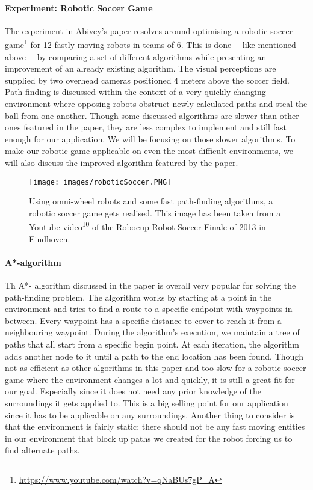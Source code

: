 \paragraph{Experiment: Robotic Soccer Game}
The experiment in Abivey's paper\cite{abiyev2015improved} resolves around optimising a robotic soccer game\footnote{\url{https://www.youtube.com/watch?v=qNaBUs7gP\_A}} for 12 fastly moving robots in teams of 6. This is done ---like mentioned above--- by comparing a set of different algorithms while presenting an improvement of an already existing algorithm. The visual perceptions are supplied by two overhead cameras positioned 4 meters above the soccer field. Path finding is discussed within the context of a very quickly changing environment where opposing robots obstruct newly calculated paths and steal the ball from one another. 
\newline
Though some discussed algorithms are slower than other ones featured in the paper, they are less complex to implement and still fast enough for our application. We will be focusing on those slower algorithms. To make our robotic game applicable on even the most difficult environments, we will also discuss the improved algorithm featured by the paper.
\begin{figure}[!htb]
	\texttt{[image: images/roboticSoccer.PNG]}
	\captionsetup{width=1.0\textwidth}
	\centering
	\caption{Using omni-wheel robots and some fast path-finding algorithms, a robotic soccer game gets realised. This image has been taken from a Youtube-video\textsuperscript{10} of the Robocup Robot Soccer Finale of 2013 in Eindhoven.}
\end{figure}

\paragraph{A*-algorithm}
Th A*- algorithm discussed in the paper\cite{abiyev2015improved} is overall very popular for solving the path-finding problem.
The algorithm works by starting at a point in the environment and tries to find a route to a specific endpoint with waypoints in between. Every waypoint has a specific distance to cover to reach it from a neighbouring waypoint. During the algorithm's execution, we maintain a tree of paths that all start from a specific begin point. At each iteration, the algorithm adds another node to it until a path to the end location has been found. Though not as efficient as other algorithms in this paper and too slow for a robotic soccer game where the environment changes a lot and quickly, it is still a great fit for our goal. Especially since it does not need any prior knowledge of the surroundings it gets applied to. This is a big selling point for our application since it has to be applicable on any surroundings. Another thing to consider is that the environment is fairly static: there should not be any fast moving entities in our environment that block up paths we created for the robot forcing us to find alternate paths.  

